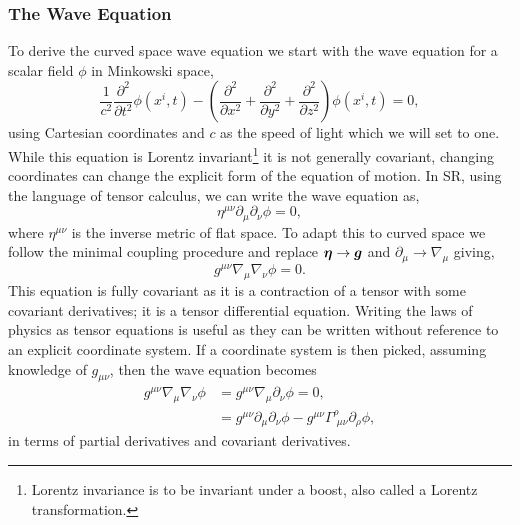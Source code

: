 \subsubsection{The Wave Equation}
To derive the curved space wave equation we start with the wave equation for a scalar field $\phi$ in Minkowski space,
\begin{equation}
\frac{1}{c^2}\frac{\partial^2}{\partial t^2} \phi(x^i,t) - \left(\frac{\partial^2}{\partial x^2}+\frac{\partial^2}{\partial y^2}+\frac{\partial^2}{\partial z^2} \right)\phi(x^i,t)=0, \label{intro:eq:fullflatwave}
\end{equation}
using Cartesian coordinates and $c$ as the speed of light which we will set to one. While this equation is Lorentz invariant\footnote{Lorentz invariance is to be invariant under a boost, also called a Lorentz transformation.} it is not generally covariant, changing coordinates can change the explicit form of the equation of motion. In SR, using the language of tensor calculus, we can write the wave equation as,
\begin{equation}
\eta^{\mu\nu}\partial_\mu\partial_\nu\phi=0\label{intro:eq:waveeqn},
\end{equation}
where $\eta^{\mu\nu}$ is the inverse metric of flat space. To adapt this to curved space we follow the minimal coupling procedure and replace $\boldsymbol{\eta} \rightarrow \boldsymbol{g}$ and $\partial_\mu \rightarrow \nabla_\mu$ giving,
\begin{equation}
g^{\mu\nu}\nabla_\mu \nabla_\nu\phi =0. \label{intro:eq:grwave}
\end{equation}
This equation is fully covariant as it is a contraction of a tensor with some covariant derivatives; it is a tensor differential equation. Writing the laws of physics as tensor equations is useful as they can be written without reference to an explicit coordinate system. If a coordinate system is then picked, assuming knowledge of $g_{\mu\nu}$, then the wave equation becomes
\begin{align}
g^{\mu\nu}\nabla_\mu \nabla_\nu \phi &= g^{\mu\nu}\nabla_\mu \partial_\nu \phi =0,\\
&= g^{\mu\nu}\partial_\mu \partial_\nu \phi - g^{\mu\nu}\Gamma^\rho_{\,\,\mu\nu}\partial_\rho \phi,
\end{align}
in terms of partial derivatives and covariant derivatives.

